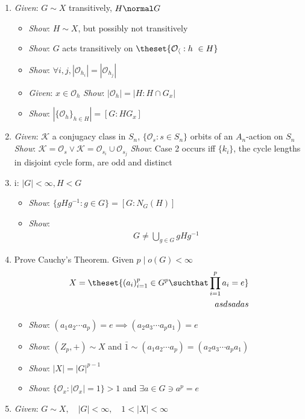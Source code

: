 \begin{enumerate}
\def\labelenumi{\arabic{enumi}.}
\item
  \emph{Given}: \(G \sim X\) transitively, \(H \normal G\)

  \begin{itemize}
  \tightlist
  \item
    \emph{Show}: \(H \sim X\), but possibly not transitively
  \item
    \emph{Show}: \(G\) acts transitively on
    \(\theset{ \mathcal{O_h} : h\ \in H}\)
  \item
    \emph{Show}:
    \(\forall i, j, |\mathcal{O}_{h_i}| = |\mathcal{O}_{h_j}|\)
  \item
    \emph{Given}: \(x\in \mathcal{O}_h\) \emph{Show}:
    \(|\mathcal{O}_h| = |H : H \cap G_x|\)
  \item
    \emph{Show}: \(|\{\mathcal{O}_h\}_{h\in H}| = [G : HG_x]\)
  \end{itemize}
\item
  \emph{Given}: \(\mathcal{K}\) a conjugacy class in \(S_n\),
  \(\{\mathcal{O}_{s}:s\in S_n\}\) orbits of an \(A_n\)-action on
  \(S_n\) \emph{Show}:
  \(\mathcal{K} = \mathcal{O}_s \vee \mathcal{K} = \mathcal{O}_{s_i} \cup \mathcal{O}_{s_j}\)
  \emph{Show}: Case 2 occurs iff \(\{k_i\}\), the cycle lengths in
  disjoint cycle form, are odd and distinct
\item
  i: \(|G| < \infty, H < G\)

  \begin{itemize}
  \tightlist
  \item
    \emph{Show}: \(\{ gHg^{-1} : g\in G\} = [G : N_G(H)]\)
  \item
    \emph{Show}:
    \begin{align*}G \neq \bigcup_{g\in G} gHg^{-1}\end{align*}
  \end{itemize}
\item
  Prove Cauchy's Theorem. Given \(p\mid o(G) <\infty\)
  \begin{align*}
  X = \theset{ (a_{i})_{i=1}^p \in G^p \suchthat \prod_{i=1}^p a_i = e} \\
  asdsadas
  \end{align*}

  \begin{itemize}
  \tightlist
  \item
    \emph{Show}:
    \((a_1 a_2\cdots a_p) = e \implies (a_2 a_3 \cdots a_p a_1) = e\)
  \item
    \emph{Show}: \((Z_p, +) \sim X\) and
    \(\bar 1 \sim (a_1 a_2 \cdots a_p) = (a_2 a_3 \cdots a_p a_1)\)
  \item
    \emph{Show}: \(|X| = |G|^{p-1}\)
  \item
    \emph{Show}: \(\{ \mathcal{O}_x : |\mathcal{O}_x| = 1 \} > 1\) and
    \(\exists a \in G \ni a^p = e\)
  \end{itemize}
\item
  \emph{Given}:
  \(G \sim X, \quad |G| < \infty , \quad 1 < |X| < \infty\)
\end{enumerate}

